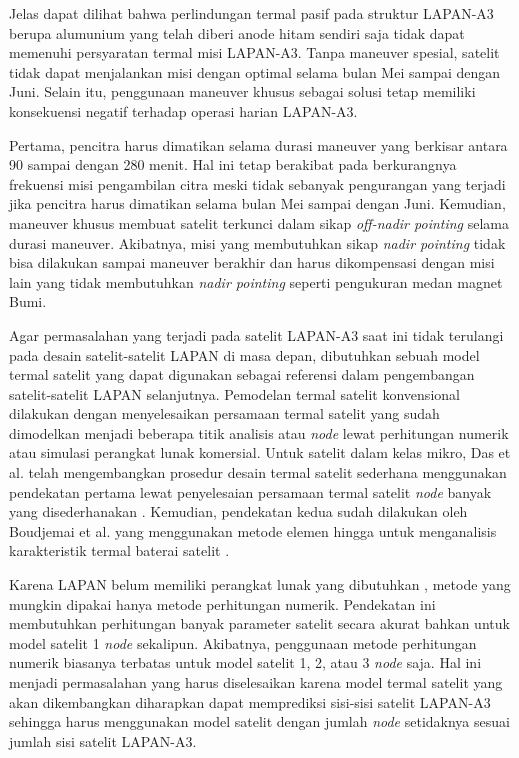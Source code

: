 Jelas dapat dilihat bahwa perlindungan termal pasif pada struktur LAPAN-A3
berupa alumunium yang telah diberi anode hitam sendiri saja tidak dapat
memenuhi persyaratan termal misi LAPAN-A3. Tanpa maneuver spesial, satelit
tidak dapat menjalankan misi dengan optimal selama bulan Mei sampai dengan
Juni. Selain itu, penggunaan maneuver khusus sebagai solusi tetap memiliki
konsekuensi negatif terhadap operasi harian LAPAN-A3.

Pertama, pencitra harus dimatikan selama durasi maneuver yang berkisar antara
90 sampai dengan 280 menit. Hal ini tetap berakibat pada berkurangnya frekuensi
misi pengambilan citra meski tidak sebanyak pengurangan yang terjadi jika
pencitra harus dimatikan selama bulan Mei sampai dengan Juni. Kemudian,
maneuver khusus membuat satelit terkunci dalam sikap \textit{off-nadir
pointing} selama durasi maneuver. Akibatnya, misi yang membutuhkan sikap
\textit{nadir pointing} tidak bisa dilakukan sampai maneuver berakhir dan harus
dikompensasi dengan misi lain yang tidak membutuhkan \textit{nadir pointing}
seperti pengukuran medan magnet Bumi.

Agar permasalahan yang terjadi pada satelit LAPAN-A3 saat ini tidak terulangi
pada desain satelit-satelit LAPAN di masa depan, dibutuhkan sebuah model termal
satelit yang dapat digunakan sebagai referensi dalam pengembangan
satelit-satelit LAPAN selanjutnya. Pemodelan termal satelit konvensional
dilakukan dengan menyelesaikan persamaan termal satelit yang sudah dimodelkan
menjadi beberapa titik analisis atau \textit{node} lewat perhitungan numerik
atau simulasi perangkat lunak komersial. Untuk satelit dalam kelas mikro, Das
et al. telah mengembangkan prosedur desain termal satelit sederhana menggunakan
pendekatan pertama lewat penyelesaian persamaan termal satelit \textit{node}
banyak yang disederhanakan \cite{das}. Kemudian, pendekatan kedua sudah
dilakukan oleh Boudjemai et al. yang menggunakan metode elemen hingga untuk
menganalisis karakteristik termal baterai satelit \cite{boudjemai2015}.

Karena LAPAN belum memiliki perangkat lunak yang dibutuhkan
\cite{budiantoro2019}, metode yang mungkin dipakai hanya metode perhitungan
numerik. Pendekatan ini membutuhkan perhitungan banyak parameter satelit secara
akurat bahkan untuk model satelit 1 \textit{node} sekalipun. Akibatnya,
penggunaan metode perhitungan numerik biasanya terbatas untuk model satelit 1,
2, atau 3 \textit{node} saja. Hal ini menjadi permasalahan yang harus
diselesaikan karena model termal satelit yang akan dikembangkan diharapkan
dapat memprediksi sisi-sisi satelit LAPAN-A3 sehingga harus menggunakan model
satelit dengan jumlah \textit{node} setidaknya sesuai jumlah sisi satelit
LAPAN-A3.


